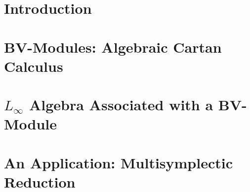 \documentclass[handout,10pt]{beamer}
\begin{document}
\section{Introduction}
	



\section{BV-Modules: Algebraic Cartan Calculus}
	

\section{$L_\infty$ Algebra Associated with a BV-Module}
	

\section{An Application: Multisymplectic Reduction}
	
\end{document}
